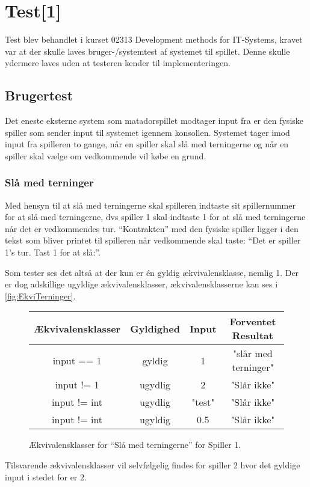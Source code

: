 \chapter{Test[1]} \label{chap:Test}
Test blev behandlet i kurset 02313 Development methods for IT-Systems, kravet var at der skulle laves bruger-/systemtest af systemet til spillet. Denne skulle ydermere laves uden at testeren kender til implementeringen.

\section{Brugertest}
Det eneste eksterne system som matadorspillet modtager input fra er den fysiske spiller som sender input til systemet igennem konsollen. Systemet tager imod input fra spilleren to gange, når en spiller skal slå med terningerne og når en spiller skal vælge om vedkommende vil købe en grund.

\subsection{Slå med terninger}
Med hensyn til at slå med terningerne skal spilleren indtaste sit spillernummer for at slå med terningerne, dvs spiller 1 skal indtaste 1 for at slå med terningerne når det er vedkommendes tur. \enquote{Kontrakten} med den fysiske spiller ligger i den tekst som bliver printet til spilleren når vedkommende skal taste: \enquote{Det er spiller 1's tur. Tast 1 for at slå:}.

Som tester ses det altså at der kun er én gyldig ækvivalensklasse, nemlig 1. Der er dog adskillige ugyldige ækvivalensklasser, ækvivalensklasserne kan ses i \vref{fig:EkviTerninger}.
\begin{figure}
\caption{Ækvivalensklasser for \enquote{Slå med terningerne} for Spiller 1.}
\label{fig:EkviTerninger}
\centering
\begin{tabular}{cccc}
Ækvivalensklasser & Gyldighed & Input  & Forventet Resultat \\
\hline
input == 1 & gyldig & 1 & "slår med terninger"\\ 
input != 1 & ugydlig & 2 & "Slår ikke"\\ 
input != int & ugydlig & "test" & "Slår ikke"\\
input != int & ugyldig & 0.5 & "Slår ikke" \\
\end{tabular} 
\end{figure}

Tilsvarende ækvivalensklasser vil selvfølgelig findes for spiller 2 hvor det gyldige input i stedet for er 2.

